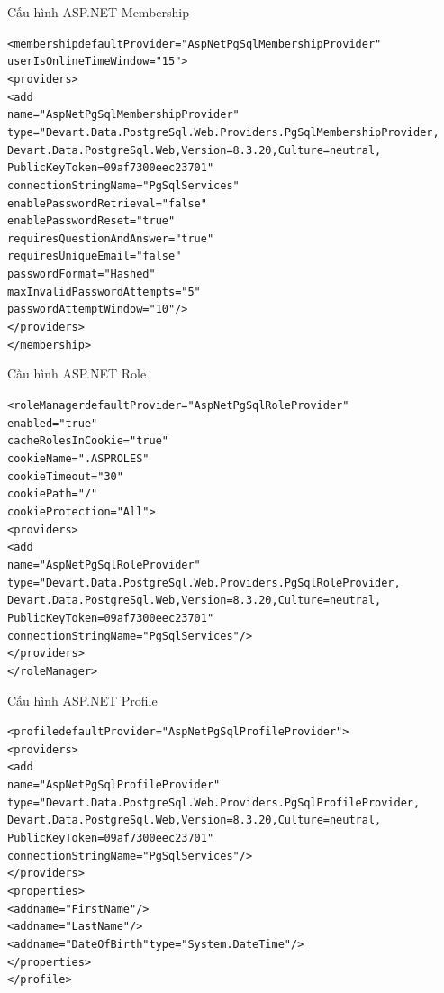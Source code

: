 \documentclass[14pt]{article}
\begin{document}
Cấu hình ASP.NET Membership
\begin{mdframed}[backgroundcolor=white, linecolor=black, roundcorner=5pt]
\begin{alltt}
<membership defaultProvider="AspNetPgSqlMembershipProvider"
            userIsOnlineTimeWindow="15">
  <providers>
    <add
      name="AspNetPgSqlMembershipProvider"
      type="Devart.Data.PostgreSql.Web.Providers.PgSqlMembershipProvider,
            Devart.Data.PostgreSql.Web, Version=8.3.20, Culture=neutral,
            PublicKeyToken=09af7300eec23701"
      connectionStringName="PgSqlServices"
      enablePasswordRetrieval="false"
      enablePasswordReset="true"
      requiresQuestionAndAnswer="true"
      requiresUniqueEmail="false"
      passwordFormat="Hashed"
      maxInvalidPasswordAttempts="5"
      passwordAttemptWindow="10" />
  </providers>
</membership>
\end{alltt}
\end{mdframed}

Cấu hình ASP.NET Role
\begin{mdframed}[backgroundcolor=white, linecolor=black, roundcorner=5pt]
\begin{alltt}
<roleManager defaultProvider="AspNetPgSqlRoleProvider"
             enabled="true"
             cacheRolesInCookie="true"
             cookieName=".ASPROLES"
             cookieTimeout="30"
             cookiePath="/"
             cookieProtection="All">
  <providers>
    <add
      name="AspNetPgSqlRoleProvider"
      type="Devart.Data.PostgreSql.Web.Providers.PgSqlRoleProvider,
            Devart.Data.PostgreSql.Web, Version=8.3.20, Culture=neutral,
            PublicKeyToken=09af7300eec23701"
      connectionStringName="PgSqlServices" />
  </providers>
</roleManager>
\end{alltt}
\end{mdframed}

Cấu hình ASP.NET Profile 
\begin{mdframed}[backgroundcolor=white, linecolor=black, roundcorner=5pt]
\begin{alltt}
<profile defaultProvider="AspNetPgSqlProfileProvider">
  <providers>
    <add
      name="AspNetPgSqlProfileProvider"
      type="Devart.Data.PostgreSql.Web.Providers.PgSqlProfileProvider,
            Devart.Data.PostgreSql.Web, Version=8.3.20, Culture=neutral,
            PublicKeyToken=09af7300eec23701"
      connectionStringName="PgSqlServices" />
  </providers>
  <properties>
    <add name="FirstName" />
    <add name="LastName" />
    <add name="DateOfBirth" type="System.DateTime"/>
  </properties>
</profile>
\end{alltt}
\end{mdframed}
\end{document}
